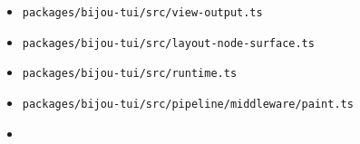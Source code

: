 \begin{itemize}
\tightlist
\item
  \texttt{p\allowbreak{}a\allowbreak{}c\allowbreak{}k\allowbreak{}a\allowbreak{}g\allowbreak{}e\allowbreak{}s\allowbreak{}/\allowbreak{}b\allowbreak{}i\allowbreak{}j\allowbreak{}o\allowbreak{}u\allowbreak{}-\allowbreak{}t\allowbreak{}u\allowbreak{}i\allowbreak{}/\allowbreak{}s\allowbreak{}r\allowbreak{}c\allowbreak{}/\allowbreak{}v\allowbreak{}i\allowbreak{}e\allowbreak{}w\allowbreak{}-\allowbreak{}o\allowbreak{}u\allowbreak{}t\allowbreak{}p\allowbreak{}u\allowbreak{}t\allowbreak{}.\allowbreak{}t\allowbreak{}s}
\item
  \texttt{p\allowbreak{}a\allowbreak{}c\allowbreak{}k\allowbreak{}a\allowbreak{}g\allowbreak{}e\allowbreak{}s\allowbreak{}/\allowbreak{}b\allowbreak{}i\allowbreak{}j\allowbreak{}o\allowbreak{}u\allowbreak{}-\allowbreak{}t\allowbreak{}u\allowbreak{}i\allowbreak{}/\allowbreak{}s\allowbreak{}r\allowbreak{}c\allowbreak{}/\allowbreak{}l\allowbreak{}a\allowbreak{}y\allowbreak{}o\allowbreak{}u\allowbreak{}t\allowbreak{}-\allowbreak{}n\allowbreak{}o\allowbreak{}d\allowbreak{}e\allowbreak{}-\allowbreak{}s\allowbreak{}u\allowbreak{}r\allowbreak{}f\allowbreak{}a\allowbreak{}c\allowbreak{}e\allowbreak{}.\allowbreak{}t\allowbreak{}s}
\item
  \texttt{p\allowbreak{}a\allowbreak{}c\allowbreak{}k\allowbreak{}a\allowbreak{}g\allowbreak{}e\allowbreak{}s\allowbreak{}/\allowbreak{}b\allowbreak{}i\allowbreak{}j\allowbreak{}o\allowbreak{}u\allowbreak{}-\allowbreak{}t\allowbreak{}u\allowbreak{}i\allowbreak{}/\allowbreak{}s\allowbreak{}r\allowbreak{}c\allowbreak{}/\allowbreak{}r\allowbreak{}u\allowbreak{}n\allowbreak{}t\allowbreak{}i\allowbreak{}m\allowbreak{}e\allowbreak{}.\allowbreak{}t\allowbreak{}s}
\item
  \texttt{p\allowbreak{}a\allowbreak{}c\allowbreak{}k\allowbreak{}a\allowbreak{}g\allowbreak{}e\allowbreak{}s\allowbreak{}/\allowbreak{}b\allowbreak{}i\allowbreak{}j\allowbreak{}o\allowbreak{}u\allowbreak{}-\allowbreak{}t\allowbreak{}u\allowbreak{}i\allowbreak{}/\allowbreak{}s\allowbreak{}r\allowbreak{}c\allowbreak{}/\allowbreak{}p\allowbreak{}i\allowbreak{}p\allowbreak{}e\allowbreak{}l\allowbreak{}i\allowbreak{}n\allowbreak{}e\allowbreak{}/\allowbreak{}m\allowbreak{}i\allowbreak{}d\allowbreak{}d\allowbreak{}l\allowbreak{}e\allowbreak{}w\allowbreak{}a\allowbreak{}r\allowbreak{}e\allowbreak{}/\allowbreak{}p\allowbreak{}a\allowbreak{}i\allowbreak{}n\allowbreak{}t\allowbreak{}.\allowbreak{}t\allowbreak{}s}
\item

\end{itemize}
